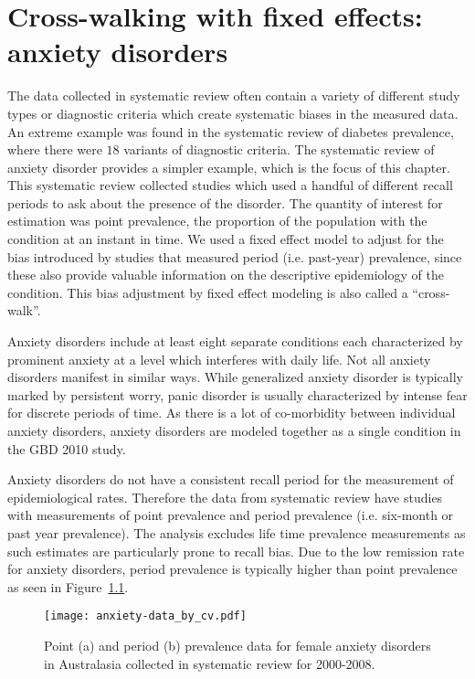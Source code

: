 \chapter{Cross-walking with fixed effects: anxiety disorders}
\label{applications-efx_study_level}

The data collected in systematic review often contain a variety of
different study types or diagnostic criteria which create systematic
biases in the measured data.  An extreme example was found in the
systematic review of diabetes prevalence, where there were $18$ variants
of diagnostic criteria.  The systematic review of anxiety disorder
provides a simpler example, which is the focus of this chapter. This
systematic review collected studies which used a handful of different
recall periods to ask about the presence of the disorder. The quantity
of interest for estimation was point prevalence, the
proportion of the population with the condition at an instant in time.
We used a fixed effect model to adjust for the bias introduced by
studies that measured period (i.e. past-year) prevalence, since these also provide
valuable information on the descriptive epidemiology of the condition.
This bias adjustment by fixed effect modeling is also called a
``cross-walk''.

Anxiety disorders include at least eight separate conditions each
characterized by prominent anxiety at a level which interferes with
daily life.  Not all anxiety disorders manifest in similar ways.
While generalized anxiety disorder is typically marked by persistent
worry, panic disorder is usually characterized by intense fear for
discrete periods of time. \cite{american_psychiatric_association_diagnostic_2000} As there is
a lot of co-morbidity between individual anxiety disorders, anxiety
disorders are modeled together as a single condition in the GBD 2010
study.

Anxiety disorders do not have a consistent recall period for the
measurement of epidemiological rates.  Therefore the data from
systematic review have studies with measurements of point prevalence
and period prevalence (i.e. six-month or past year prevalence).  The
analysis excludes life time prevalence measurements as such estimates are
particularly prone to recall bias.  Due to the low remission rate for
anxiety disorders, period prevalence is typically higher than point
prevalence as seen in Figure~\ref{fig:app-anxiety data}.

    \begin{figure}[h]
        \begin{center}
            \texttt{[image: anxiety-data\_by\_cv.pdf]}
            \caption{Point (a) and period (b) prevalence data
              for female anxiety disorders in Australasia collected in systematic review for
              2000-2008.}
            \label{fig:app-anxiety data}
        \end{center}
    \end{figure}


